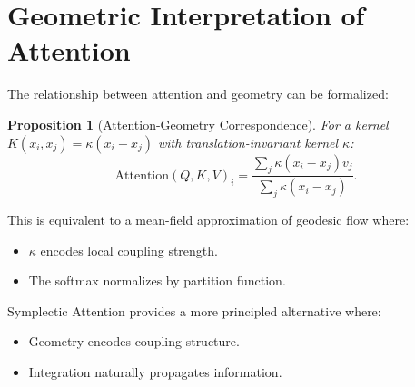 \documentclass[12pt,letterpaper,twoside]{article}
\newtheorem{prop}{Proposition}[section]
\begin{document}
\section{Geometric Interpretation of Attention}

The relationship between attention and geometry can be formalized:

\begin{prop}[Attention-Geometry Correspondence]
For a kernel $K(x_i, x_j) = \kappa(x_i - x_j)$ with translation-invariant kernel $\kappa$:
\[
\text{Attention}(Q, K, V)_i = \frac{\sum_j \kappa(x_i - x_j) v_j}{\sum_j \kappa(x_i - x_j)}.
\]
\end{prop}

This is equivalent to a mean-field approximation of geodesic flow where:

\begin{itemize}
\item $\kappa$ encodes local coupling strength.
\item The softmax normalizes by partition function.
\end{itemize}

Symplectic Attention provides a more principled alternative where:

\begin{itemize}
\item Geometry encodes coupling structure.
\item Integration naturally propagates information.
\end{itemize}
\end{document}
